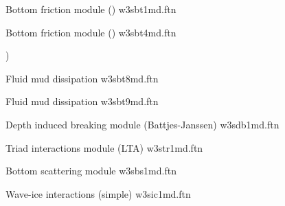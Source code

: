 \noindent
Bottom friction module (\js) \hfill {\file w3sbt1md.ftn}

\begin{flisti}
\end{flisti}

\noindent
Bottom friction module (\showex) \hfill {\file w3sbt4md.ftn}

\begin{flisti}
)
\end{flisti}

\noindent
Fluid mud dissipation \citep{art:DL78}  \hfill {\file w3sbt8md.ftn}

\begin{flisti}
\end{flisti}

\pb \noindent
Fluid mud dissipation \citep{art:Ng00}  \hfill {\file w3sbt9md.ftn}

\begin{flisti}
\end{flisti}

\noindent
Depth induced breaking module (Battjes-Janssen) \hfill {\file w3sdb1md.ftn}

\begin{flisti}
\end{flisti}

\noindent
Triad interactions module (LTA) \hfill {\file w3str1md.ftn}

\begin{flisti}
\end{flisti}

\noindent
Bottom scattering module \hfill {\file w3sbs1md.ftn}

\begin{flisti}
\end{flisti}

\pb \noindent
Wave-ice interactions (simple) \hfill {\file w3sic1md.ftn}

\begin{flisti}
\end{flisti}


